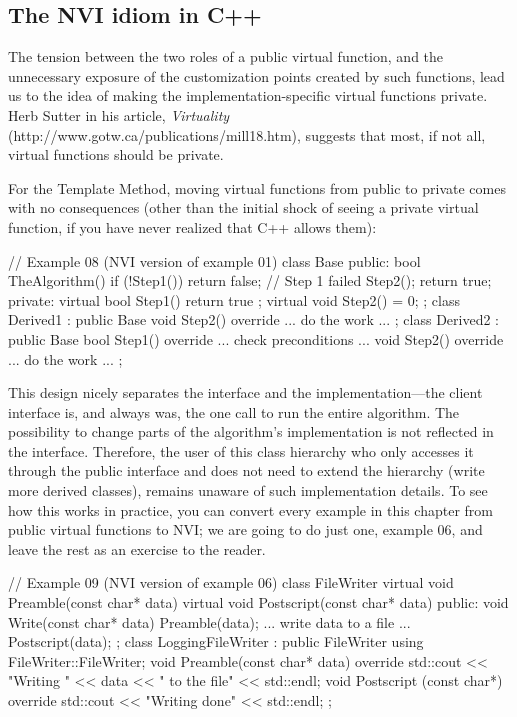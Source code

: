 \subsection{The NVI idiom in C++}

The tension between the two roles of a public virtual function, and the unnecessary exposure of the customization points created by such functions, lead us to the idea of making the implementation-specific virtual functions private. Herb Sutter in his article, \emph{Virtuality} (http://www.gotw.ca/publications/mill18.htm), suggests that most, if not all, virtual functions should be private.

For the Template Method, moving virtual functions from public to private comes with no consequences (other than the initial shock of seeing a private virtual function, if you have never realized that C++ allows them):

\begin{code}
// Example 08 (NVI version of example 01)
class Base {
  public:
  bool TheAlgorithm() {
    if (!Step1()) return false; // Step 1 failed
    Step2();
    return true;
  }
  private:
  virtual bool Step1() { return true };
  virtual void Step2() = 0;
};
class Derived1 : public Base {
  void Step2() override { ... do the work ... }
};
class Derived2 : public Base {
  bool Step1() override { ... check preconditions ... }
  void Step2() override { ... do the work ... }
};
\end{code}

This design nicely separates the interface and the implementation---the client interface is, and always was, the one call to run the entire algorithm. The possibility to change parts of the algorithm's implementation is not reflected in the interface. Therefore, the user of this class hierarchy who only accesses it through the public interface and does not need to extend the hierarchy (write more derived classes), remains unaware of such implementation details. To see how this works in practice, you can convert every example in this chapter from public virtual functions to NVI; we are going to do just one, example 06, and leave the rest as an exercise to the reader.

\begin{code}
// Example 09 (NVI version of example 06)
class FileWriter {
  virtual void Preamble(const char* data) {}
  virtual void Postscript(const char* data) {}
  public:
  void Write(const char* data) {
    Preamble(data);
    ... write data to a file ...
    Postscript(data);
  }
};
class LoggingFileWriter : public FileWriter {
  using FileWriter::FileWriter;
  void Preamble(const char* data) override {
    std::cout << "Writing " << data << " to the file" <<
      std::endl;
  }
  void Postscript (const char*) override {
    std::cout << "Writing done" << std::endl;
  }
};
\end{code}

